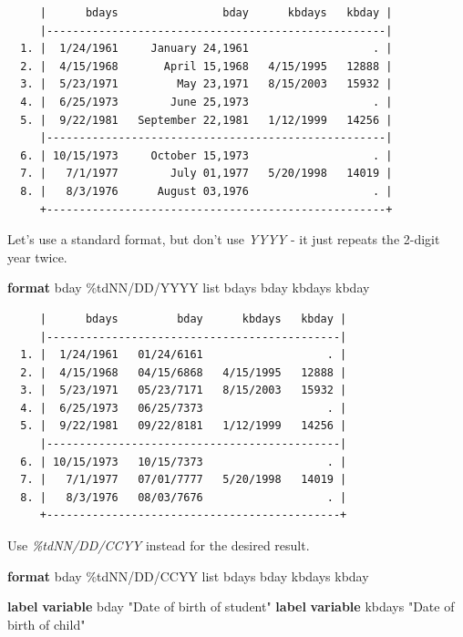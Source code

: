 \documentclass[
]{book}
\newenvironment{Shaded}{\begin{snugshade}}{\end{snugshade}}
\newcommand{\KeywordTok}[1]{\textcolor[rgb]{0.13,0.29,0.53}{\textbf{#1}}}
\newcommand{\NormalTok}[1]{#1}
\newcommand{\OtherTok}[1]{\textcolor[rgb]{0.56,0.35,0.01}{#1}}
\newcommand{\StringTok}[1]{\textcolor[rgb]{0.31,0.60,0.02}{#1}}
\begin{document}
\begin{verbatim}
     |      bdays                bday      kbdays   kbday |
     |----------------------------------------------------|
  1. |  1/24/1961     January 24,1961                   . |
  2. |  4/15/1968       April 15,1968   4/15/1995   12888 |
  3. |  5/23/1971         May 23,1971   8/15/2003   15932 |
  4. |  6/25/1973        June 25,1973                   . |
  5. |  9/22/1981   September 22,1981   1/12/1999   14256 |
     |----------------------------------------------------|
  6. | 10/15/1973     October 15,1973                   . |
  7. |   7/1/1977        July 01,1977   5/20/1998   14019 |
  8. |   8/3/1976      August 03,1976                   . |
     +----------------------------------------------------+
\end{verbatim}

Let's use a standard format, but don't use \emph{YYYY} - it just repeats the 2-digit year twice.

\begin{Shaded}
\begin{Highlighting}[]
\KeywordTok{format}\NormalTok{ bday \%tdNN/DD/YYYY}
\OtherTok{list}\NormalTok{ bdays bday kbdays kbday}
\end{Highlighting}
\end{Shaded}

\begin{verbatim}
     |      bdays         bday      kbdays   kbday |
     |---------------------------------------------|
  1. |  1/24/1961   01/24/6161                   . |
  2. |  4/15/1968   04/15/6868   4/15/1995   12888 |
  3. |  5/23/1971   05/23/7171   8/15/2003   15932 |
  4. |  6/25/1973   06/25/7373                   . |
  5. |  9/22/1981   09/22/8181   1/12/1999   14256 |
     |---------------------------------------------|
  6. | 10/15/1973   10/15/7373                   . |
  7. |   7/1/1977   07/01/7777   5/20/1998   14019 |
  8. |   8/3/1976   08/03/7676                   . |
     +---------------------------------------------+
\end{verbatim}

Use \emph{\%tdNN/DD/CCYY} instead for the desired result.

\begin{Shaded}
\begin{Highlighting}[]
\KeywordTok{format}\NormalTok{ bday \%tdNN/DD/CCYY}
\OtherTok{list}\NormalTok{ bdays bday kbdays kbday}

\KeywordTok{label} \KeywordTok{variable}\NormalTok{ bday }\StringTok{"Date of birth of student"}
\KeywordTok{label} \KeywordTok{variable}\NormalTok{ kbdays }\StringTok{"Date of birth of child"}
\end{Highlighting}
\end{Shaded}
\end{document}
